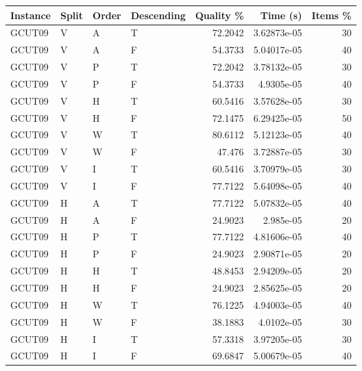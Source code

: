 \begin{tabular}{llllrrr}
    \hline
    Instance & Split & Order & Descending & Quality \% & Time (s)    & Items \% \\
    \hline
    GCUT09   & V     & A     & T          & 72.2042    & 3.62873e-05 & 30       \\
    GCUT09   & V     & A     & F          & 54.3733    & 5.04017e-05 & 40       \\
    GCUT09   & V     & P     & T          & 72.2042    & 3.78132e-05 & 30       \\
    GCUT09   & V     & P     & F          & 54.3733    & 4.9305e-05  & 40       \\
    GCUT09   & V     & H     & T          & 60.5416    & 3.57628e-05 & 30       \\
    GCUT09   & V     & H     & F          & 72.1475    & 6.29425e-05 & 50       \\
    GCUT09   & V     & W     & T          & 80.6112    & 5.12123e-05 & 40       \\
    GCUT09   & V     & W     & F          & 47.476     & 3.72887e-05 & 30       \\
    GCUT09   & V     & I     & T          & 60.5416    & 3.70979e-05 & 30       \\
    GCUT09   & V     & I     & F          & 77.7122    & 5.64098e-05 & 40       \\
    GCUT09   & H     & A     & T          & 77.7122    & 5.07832e-05 & 40       \\
    GCUT09   & H     & A     & F          & 24.9023    & 2.985e-05   & 20       \\
    GCUT09   & H     & P     & T          & 77.7122    & 4.81606e-05 & 40       \\
    GCUT09   & H     & P     & F          & 24.9023    & 2.90871e-05 & 20       \\
    GCUT09   & H     & H     & T          & 48.8453    & 2.94209e-05 & 20       \\
    GCUT09   & H     & H     & F          & 24.9023    & 2.85625e-05 & 20       \\
    GCUT09   & H     & W     & T          & 76.1225    & 4.94003e-05 & 40       \\
    GCUT09   & H     & W     & F          & 38.1883    & 4.0102e-05  & 30       \\
    GCUT09   & H     & I     & T          & 57.3318    & 3.97205e-05 & 30       \\
    GCUT09   & H     & I     & F          & 69.6847    & 5.00679e-05 & 40       \\

\end{tabular}
